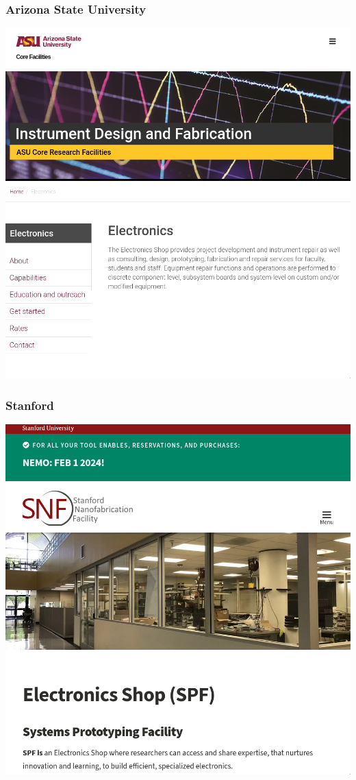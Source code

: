\documentclass{presentation}
\begin{document}
{\begin{frame}\frametitle{Arizona State University}
  \includegraphics[width=\textwidth]{"./asu.png"}
\end{frame}

\begin{frame}\frametitle{Stanford}
  \includegraphics[width=\textwidth]{"./stanford.png"}
\end{frame}

}
\end{document}
